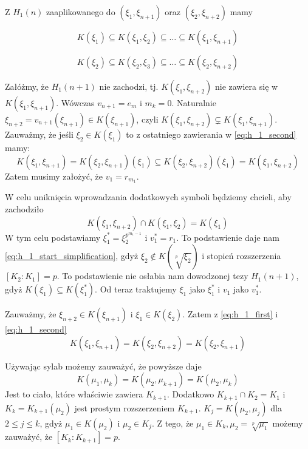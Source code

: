 Z $H_1(n)$ zaaplikowanego do $\left(\xi_1, \xi_{n+1}\right)$ oraz $\left(\xi_2,
\xi_{n+2}\right)$ mamy

\begin{equation}
  K\left(\xi_1\right) \subseteq
  K\left(\xi_1, \xi_2\right) \subseteq
  \ldots \subseteq
  K\left(\xi_1, \xi_{n+1}\right)
  \label{eq:h_1_first}
\end{equation}

\begin{equation}
  K\left(\xi_2\right) \subseteq
  K\left(\xi_2, \xi_3\right) \subseteq
  \ldots \subseteq
  K\left(\xi_2, \xi_{n+2}\right)
  \label{eq:h_1_second}
\end{equation}

Załóżmy, że $H_1(n+1)$ nie zachodzi, tj. $K\left(\xi_1, \xi_{n+2}\right)$ nie
zawiera się w $K\left(\xi_1, \xi_{n+1}\right)$. Wówczas $v_{n+1} = e_m$ i $m_k =
0$.
Naturalnie $\xi_{n+2} = v_{n+1}\left(\xi_{n+1}\right) \in
K\left(\xi_{n+1}\right)$, czyli 
${K\left(\xi_1, \xi_{n+2}\right) \subsetneq
K\left(\xi_1, \xi_{n+1}\right)}$.
Zauważmy, że jeśli $\xi_2 \in K\left(\xi_1\right)$ to z ostatniego zawierania w
\ref{eq:h_1_second} mamy:
\[
  K\left(\xi_1, \xi_{n+1}\right) =
  K\left(\xi_2, \xi_{n+1}\right)\left(\xi_1\right) \subseteq
  K\left(\xi_2, \xi_{n+2}\right)\left(\xi_1\right) =
K\left(\xi_1, \xi_{n+2}\right)\]
Zatem musimy założyć, że $v_1 = r_{m_1}$.

W celu uniknięcia wprowadzania dodatkowych symboli będziemy chcieli, aby
zachodziło 
\begin{equation}
K\left(\xi_1, \xi_{n+2}\right) \cap
K\left(\xi_1, \xi_2\right) = K\left(\xi_1\right)
\label{eq:h_1_start_simplification}
\end{equation}
W tym celu podstawiamy $\xi_1^* = \xi_2^{p^{m_1-1}}$ i $v_1^* = r_1$. To
podstawienie daje nam \ref{eq:h_1_start_simplification}, gdyż $\xi_2 \not \in
K\left(\sqrt[p]{\xi_2}\right)$ i stopień rozszerzenia $\left[K_2 : K_1\right] =
p$. To podstawienie nie osłabia nam dowodzonej tezy $H_1(n+1)$, gdyż
$K\left(\xi_1\right) \subseteq K\left(\xi_1^*\right)$. Od teraz traktujemy
$\xi_1$ jako $\xi_1^*$ i $v_1$ jako $v_1^*$.

Zauważmy, że
$\xi_{n+2} \in K\left(\xi_{n+1}\right)$ i $\xi_{1} \in K\left(\xi_{2}\right)$.
Zatem z \ref{eq:h_1_first} i \ref{eq:h_1_second}
\[
  K\left(\xi_1, \xi_{n+1}\right) =
  K\left(\xi_2, \xi_{n+2}\right) =
  K\left(\xi_2, \xi_{n+1}\right)
\]

Używając sylab możemy zauważyć, że powyższe daje
\[
  K\left(\mu_1, \mu_{k}\right) =
  K\left(\mu_2, \mu_{k+1}\right) =
  K\left(\mu_2, \mu_{k}\right)
\]
Jest to ciało, które właściwie zawiera $K_{k+1}$. Dodatkowo $K_{k+1} \cap K_2 =
K_1$ i $K_k = K_{k+1}\left(\mu_2\right)$ jest prostym rozszerzeniem $K_{k+1}$.
$K_j = K\left(\mu_2, \mu_j\right)$ dla $2 \leq j \leq k$, gdyż $\mu_1 \in
K\left(\mu_2\right)$ i $\mu_2 \in K_j$.
Z tego, że $\mu_1 \in K_k, \mu_2 = \sqrt[p]{\mu_1}$ możemy zauważyć, że
$\left[K_k : K_{k+1}\right] = p$.

